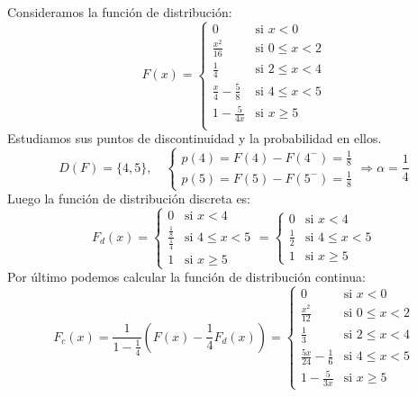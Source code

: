 \begin{example}
    Consideramos la función de distribución:
    $$F(x) = \begin{cases}
            0                         & \text{si } x < 0        \\
            \frac{x^2}{16}            & \text{si } 0 \leq x < 2 \\
            \frac{1}{4}               & \text{si } 2 \leq x < 4 \\
            \frac{x}{4} - \frac{5}{8} & \text{si } 4 \leq x < 5 \\
            1 - \frac{5}{4x}          & \text{si } x \geq 5     \\
        \end{cases}$$
    Estudiamos sus puntos de discontinuidad y la probabilidad en ellos.
    $$D(F) = \{4, 5\}, \quad \begin{cases}
            p(4) = F(4) - F(4^-) = \frac{1}{8} \\
            p(5) = F(5) - F(5^-) = \frac{1}{8}
        \end{cases}
        \Rightarrow \alpha = \frac{1}{4}$$
    Luego la función de distribución discreta es:
    $$F_d(x) = \begin{cases}
            0                               & \text{si } x < 4        \\
            \frac{\frac{1}{8}}{\frac{1}{4}} & \text{si } 4 \leq x < 5 \\
            1                               & \text{si } x \geq 5
        \end{cases} = \begin{cases}
            0           & \text{si } x < 4        \\
            \frac{1}{2} & \text{si } 4 \leq x < 5 \\
            1           & \text{si } x \geq 5
        \end{cases}$$
    Por último podemos calcular la función de distribución continua:
    $$F_c(x) = \frac{1}{1-\frac{1}{4}} \left( F(x) - \frac{1}{4}F_d(x) \right) = \begin{cases}
            0                           & \text{si } x < 0        \\
            \frac{x^2}{12}              & \text{si } 0 \leq x < 2 \\
            \frac{1}{3}                 & \text{si } 2 \leq x < 4 \\
            \frac{5x}{24} - \frac{1}{6} & \text{si } 4 \leq x < 5 \\
            1 - \frac{5}{3x}            & \text{si } x \geq 5
        \end{cases}$$
\end{example}

